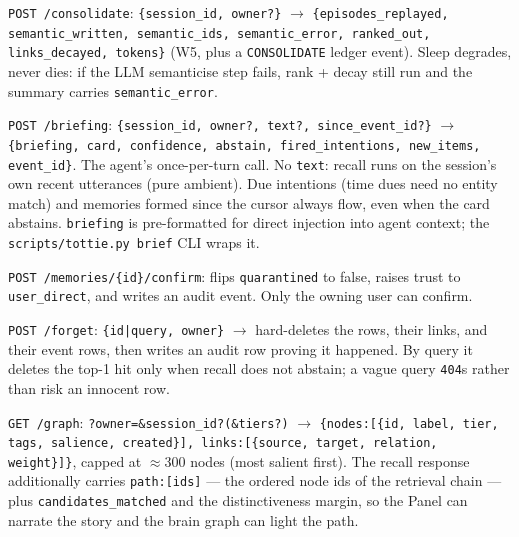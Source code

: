 \texttt{POST /consolidate}: \texttt{\{session\_id, owner?\}} $\rightarrow$
\texttt{\{episodes\_replayed, semantic\_written, semantic\_ids, semantic\_error,
ranked\_out, links\_decayed, tokens\}} (W5, plus a \texttt{CONSOLIDATE} ledger event).
Sleep degrades, never dies: if the LLM semanticise step fails, rank + decay still run
and the summary carries \texttt{semantic\_error}.

\texttt{POST /briefing}: \texttt{\{session\_id, owner?, text?, since\_event\_id?\}}
$\rightarrow$ \texttt{\{briefing, card, confidence, abstain, fired\_intentions, new\_items,
event\_id\}}. The agent's once-per-turn call. No \texttt{text}: recall runs on the
session's own recent utterances (pure ambient). Due intentions (time dues need no entity
match) and memories formed since the cursor always flow, even when the card abstains.
\texttt{briefing} is pre-formatted for direct injection into agent context; the
\texttt{scripts/tottie.py brief} CLI wraps it.

\texttt{POST /memories/\{id\}/confirm}: flips \texttt{quarantined} to false, raises trust to
\texttt{user\_direct}, and writes an audit event. Only the owning user can confirm.

\texttt{POST /forget}: \texttt{\{id|query, owner\}} $\rightarrow$ hard-deletes the rows,
their links, and their event rows, then writes an audit row proving it happened.
By query it deletes the top-1 hit only when recall does not abstain; a vague query
\texttt{404}s rather than risk an innocent row.

\texttt{GET /graph}: \texttt{?owner=\&session\_id?(\&tiers?)} $\rightarrow$
\texttt{\{nodes:[\{id, label, tier, tags, salience, created\}], links:[\{source, target,
relation, weight\}]\}}, capped at $\approx$300 nodes (most salient first). The recall response
additionally carries \texttt{path:[ids]} --- the ordered node ids of the retrieval chain --- plus
\texttt{candidates\_matched} and the distinctiveness margin, so the Panel can narrate the story
and the brain graph can light the path.

